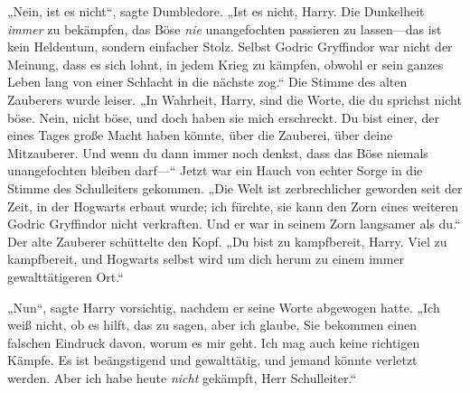 „Nein, ist es nicht“, sagte Dumbledore.
„Ist es nicht, Harry. Die Dunkelheit \emph{immer} zu bekämpfen, das Böse \emph{nie} unangefochten passieren zu lassen—das ist kein Heldentum, sondern einfacher Stolz. Selbst Godric Gryffindor war nicht der Meinung, dass es sich lohnt, in jedem Krieg zu kämpfen, obwohl er sein ganzes Leben lang von einer Schlacht in die nächste zog.“ Die Stimme des alten Zauberers wurde leiser.
„In Wahrheit, Harry, sind die Worte, die du sprichst nicht böse. Nein, nicht böse, und doch haben sie mich erschreckt. Du bist einer, der eines Tages große Macht haben könnte, über die Zauberei, über deine Mitzauberer. Und wenn du dann immer noch denkst, dass das Böse niemals unangefochten bleiben darf—“ Jetzt war ein Hauch von echter Sorge in die Stimme des Schulleiters gekommen.
„Die Welt ist zerbrechlicher geworden seit der Zeit, in der Hogwarts erbaut wurde; ich fürchte, sie kann den Zorn eines weiteren Godric Gryffindor nicht verkraften. Und er war in seinem Zorn langsamer als du.“ Der alte Zauberer schüttelte den Kopf.
„Du bist zu kampfbereit, Harry. Viel zu kampfbereit, und Hogwarts selbst wird um dich herum zu einem immer gewalttätigeren Ort.“

„Nun“, sagte Harry vorsichtig, nachdem er seine Worte abgewogen hatte.
„Ich weiß nicht, ob es hilft, das zu sagen, aber ich glaube, Sie bekommen einen falschen Eindruck davon, worum es mir geht. Ich mag auch keine richtigen Kämpfe. Es ist beängstigend und gewalttätig, und jemand könnte verletzt werden. Aber ich habe heute \emph{nicht} gekämpft, Herr Schulleiter.“

